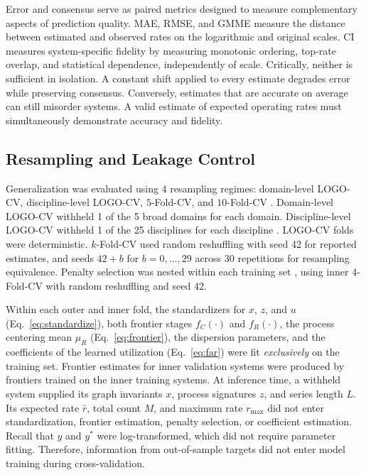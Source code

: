 \documentclass{article}
\begin{document}
Error and consensus serve as paired metrics designed to measure complementary aspects of prediction quality. MAE, RMSE, and GMME measure the distance between estimated and observed rates on the logarithmic and original scales. CI measures system-specific fidelity by measuring monotonic ordering, top-rate overlap, and statistical dependence, independently of scale. Critically, neither is sufficient in isolation. A constant shift applied to every estimate degrades error while preserving consensus. Conversely, estimates that are accurate on average can still misorder systems. A valid estimate of expected operating rates must simultaneously demonstrate accuracy and fidelity.

\subsection*{Resampling and Leakage Control}
\label{sec:resampling}
Generalization was evaluated using 4 resampling regimes: domain-level LOGO-CV, discipline-level LOGO-CV, $5$-Fold-CV, and $10$-Fold-CV \citep{ref146,ref73}. Domain-level LOGO-CV withheld 1 of the 5 broad domains for each domain. Discipline-level LOGO-CV withheld 1 of the 25 disciplines for each discipline \citep{ref68,ref69,ref70,ref74,ref107,ref172}. LOGO-CV folds were deterministic. $k$-Fold-CV used random reshuffling with seed 42 for reported estimates, and seeds $42 + b$ for $b = 0, \ldots, 29$ across 30 repetitions for resampling equivalence. Penalty selection was nested within each training set \citep{ref147}, using inner $4$-Fold-CV with random reshuffling and seed 42.

Within each outer and inner fold, the standardizers for $x$, $z$, and $u$ (Eq.~\eqref{eq:standardize}), both frontier stages $f_C(\cdot)$ and $f_R(\cdot)$, the process centering mean $\mu_R$ (Eq.~\eqref{eq:frontier}), the dispersion parameters, and the coefficients of the learned utilization (Eq.~\eqref{eq:far}) were fit \textit{exclusively} on the training set. Frontier estimates for inner validation systems were produced by frontiers trained on the inner training systems. At inference time, a withheld system supplied its graph invariants $x$, process signatures $z$, and series length $L$. Its expected rate $\bar{r}$, total count $M$, and maximum rate $r_{\max}$ did not enter standardization, frontier estimation, penalty selection, or coefficient estimation. Recall that $y$ and $y^*$ were log-transformed, which did not require parameter fitting. Therefore, information from out-of-sample targets did not enter model training during cross-validation.
\end{document}
